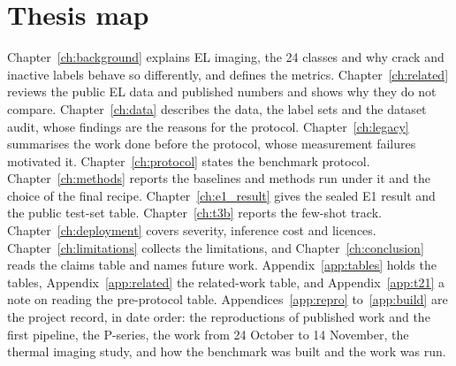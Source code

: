 \section{Thesis map}\label{sec:intro-map}

Chapter~\ref{ch:background} explains EL imaging, the 24 classes and why crack and inactive labels behave so differently, and
defines the metrics. Chapter~\ref{ch:related} reviews the public EL data and published numbers and shows why they do not compare.
Chapter~\ref{ch:data} describes the data, the label sets and the dataset audit, whose findings are the reasons for the protocol.
Chapter~\ref{ch:legacy} summarises the work done before the protocol, whose measurement failures motivated it.
Chapter~\ref{ch:protocol} states the benchmark protocol. Chapter~\ref{ch:methods} reports the baselines and methods run under it
and the choice of the final recipe. Chapter~\ref{ch:e1_result} gives the sealed E1 result and the public test-set table.
Chapter~\ref{ch:t3b} reports the few-shot track. Chapter~\ref{ch:deployment} covers severity, inference cost and licences.
Chapter~\ref{ch:limitations} collects the limitations, and Chapter~\ref{ch:conclusion} reads the claims table and names future
work. Appendix~\ref{app:tables} holds the tables, Appendix~\ref{app:related} the related-work table, and
Appendix~\ref{app:t21} a note on reading the pre-protocol table.
Appendices~\ref{app:repro} to~\ref{app:build} are the project record, in date order: the reproductions of published work and
the first pipeline, the P-series, the work from 24 October to 14 November, the thermal imaging study, and how the benchmark was
built and the work was run.
